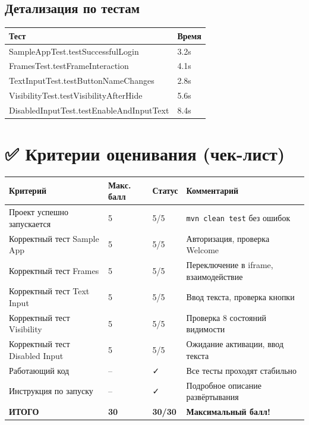 \documentclass[12pt,a4paper]{article}
\begin{document}
\subsection{Детализация по тестам}

\begin{table}[h!]
\centering
\begin{tabular}{p{8cm} p{3cm}}
\toprule
\textbf{Тест} & \textbf{Время} \\
\midrule
SampleAppTest.testSuccessfulLogin & 3.2s \\
FramesTest.testFrameInteraction & 4.1s \\
TextInputTest.testButtonNameChanges & 2.8s \\
VisibilityTest.testVisibilityAfterHide & 5.6s \\
DisabledInputTest.testEnableAndInputText & 8.4s \\
\bottomrule
\end{tabular}
\end{table}


\section{✅ Критерии оценивания (чек-лист)}

\begin{table}[h!]
\centering
\begin{tabular}{p{5cm} p{2cm} p{2cm} p{3cm}}
\toprule
\textbf{Критерий} & \textbf{Макс. балл} & \textbf{Статус} & \textbf{Комментарий} \\
\midrule
Проект успешно запускается & 5 & 5/5 & \texttt{mvn clean test} без ошибок \\
Корректный тест Sample App & 5 & 5/5 & Авторизация, проверка Welcome \\
Корректный тест Frames & 5 & 5/5 & Переключение в iframe, взаимодействие \\
Корректный тест Text Input & 5 & 5/5 & Ввод текста, проверка кнопки \\
Корректный тест Visibility & 5 & 5/5 & Проверка 8 состояний видимости \\
Корректный тест Disabled Input & 5 & 5/5 & Ожидание активации, ввод текста \\
Работающий код & -- & \faCheck & Все тесты проходят стабильно \\
Инструкция по запуску & -- & \faCheck & Подробное описание развёртывания \\
\midrule
\textbf{ИТОГО} & \textbf{30} & \textbf{30/30} & \textbf{Максимальный балл!} \\
\bottomrule
\end{tabular}
\end{table}
\end{document}
